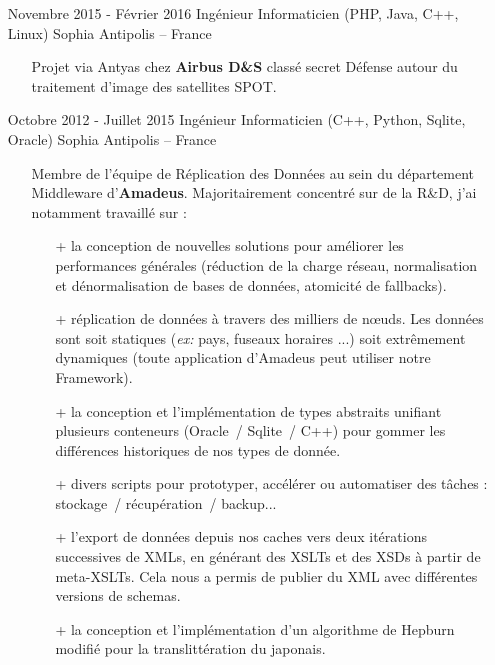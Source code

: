\documentclass{res}
\begin{document}
\begin{resume}
\begin{itemize}
\begin{itemize}
\begin{itemize}
				\item[+] Divers scripts en Python (ex. DTMF \& Morse au-dessus de SoX). 
				\item[+] C\^ot\'e Front-End : HTML, Bootstrap \& uikit, Angular 1.5.
			\end{itemize}
		\end{itemize}
		\item[] Novembre 2015 - F\'evrier 2016 \tabto{5cm} Ing\'enieur Informaticien (PHP, Java, C++, Linux) \hfill Sophia Antipolis -- France
		\begin{itemize}
			\item[] Projet via Antyas chez \textbf{Airbus D\&S} class\'e secret D\'efense autour du traitement d'image des satellites SPOT.
		\end{itemize}
		\item[] Octobre 2012 - Juillet 2015 \tabto{5cm} Ing\'enieur Informaticien (C++, Python, Sqlite, Oracle)  \hfill Sophia Antipolis -- France
		\begin{itemize}
			\item[] Membre de l'\'equipe de R\'eplication des Donn\'ees au sein du d\'epartement Middleware d'\textbf{Amadeus}. Majoritairement concentr\'e sur de la R\&D, j'ai notamment travaill\'e sur :
			\begin{itemize}
				\item[+] la conception de nouvelles solutions pour am\'eliorer les performances g\'en\'erales (r\'eduction de la charge r\'eseau, normalisation et d\'enormalisation de bases de donn\'ees, atomicit\'e de fallbacks).
				\item[+] r\'eplication de donn\'ees \`a travers des milliers de n\oe{}uds. Les donn\'ees sont soit statiques (\textit{ex:} pays, fuseaux horaires ...) soit extr\^emement dynamiques (toute application d'Amadeus peut utiliser notre Framework).
				\item[+] la conception et l'impl\'ementation de types abstraits unifiant plusieurs conteneurs (Oracle~/ Sqlite~/ C++) pour gommer les diff\'erences historiques de nos types de donn\'ee.
				\item[+] divers scripts pour prototyper, acc\'el\'erer ou automatiser des t\^aches : stockage~/ r\'ecup\'eration~/ backup...
				\item[+] l'export de donn\'ees depuis nos caches vers deux it\'erations successives de XMLs, en g\'en\'erant des XSLTs et des XSDs \`a partir de meta-XSLTs. Cela nous a permis de publier du XML avec diff\'erentes versions de schemas.
				\item[+] la conception et l'impl\'ementation d'un algorithme de Hepburn modifi\'e pour la translitt\'eration du japonais.

\end{itemize}
\end{itemize}
\end{itemize}
\end{resume}
\end{document}
